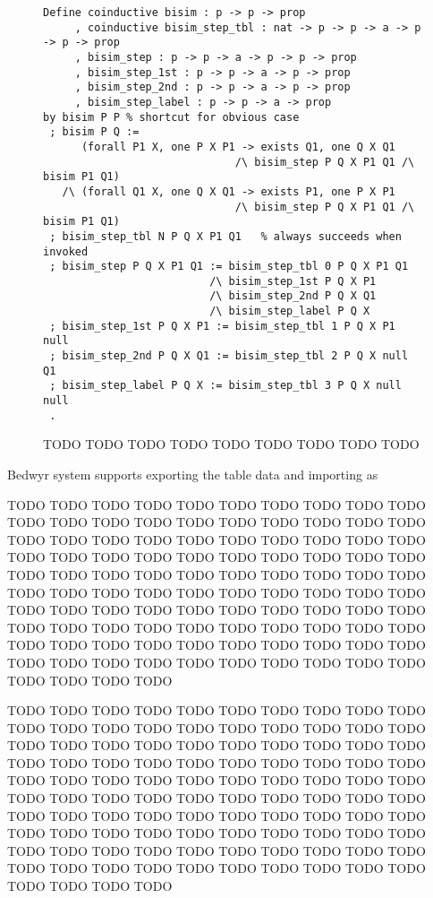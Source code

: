 \documentclass{llncs}
\begin{document}
\begin{figure}
\begin{verbatim}
Define coinductive bisim : p -> p -> prop
     , coinductive bisim_step_tbl : nat -> p -> p -> a -> p -> p -> prop
     , bisim_step : p -> p -> a -> p -> p -> prop
     , bisim_step_1st : p -> p -> a -> p -> prop
     , bisim_step_2nd : p -> p -> a -> p -> prop
     , bisim_step_label : p -> p -> a -> prop
by bisim P P % shortcut for obvious case
 ; bisim P Q :=
      (forall P1 X, one P X P1 -> exists Q1, one Q X Q1
                              /\ bisim_step P Q X P1 Q1 /\ bisim P1 Q1)
   /\ (forall Q1 X, one Q X Q1 -> exists P1, one P X P1
                              /\ bisim_step P Q X P1 Q1 /\ bisim P1 Q1)
 ; bisim_step_tbl N P Q X P1 Q1   % always succeeds when invoked
 ; bisim_step P Q X P1 Q1 := bisim_step_tbl 0 P Q X P1 Q1
                          /\ bisim_step_1st P Q X P1
                          /\ bisim_step_2nd P Q X Q1
                          /\ bisim_step_label P Q X
 ; bisim_step_1st P Q X P1 := bisim_step_tbl 1 P Q X P1 null
 ; bisim_step_2nd P Q X Q1 := bisim_step_tbl 2 P Q X null Q1
 ; bisim_step_label P Q X := bisim_step_tbl 3 P Q X null null
 .
\end{verbatim}
\vspace*{-3ex}
\caption{TODO TODO TODO TODO TODO TODO TODO TODO TODO}
\label{fig:ccsbisim}
\end{figure}

Bedwyr system supports exporting the table data and importing as

TODO TODO TODO TODO TODO TODO TODO TODO TODO TODO TODO TODO TODO
TODO TODO TODO TODO TODO TODO TODO TODO TODO TODO TODO TODO TODO
TODO TODO TODO TODO TODO TODO TODO TODO TODO TODO TODO TODO TODO
TODO TODO TODO TODO TODO TODO TODO TODO TODO TODO TODO TODO TODO
TODO TODO TODO TODO TODO TODO TODO TODO TODO TODO TODO TODO TODO
TODO TODO TODO TODO TODO TODO TODO TODO TODO TODO TODO TODO TODO
TODO TODO TODO TODO TODO TODO TODO TODO TODO TODO TODO TODO TODO
TODO TODO TODO TODO TODO TODO TODO TODO TODO TODO TODO TODO TODO

TODO TODO TODO TODO TODO TODO TODO TODO TODO TODO TODO TODO TODO
TODO TODO TODO TODO TODO TODO TODO TODO TODO TODO TODO TODO TODO
TODO TODO TODO TODO TODO TODO TODO TODO TODO TODO TODO TODO TODO
TODO TODO TODO TODO TODO TODO TODO TODO TODO TODO TODO TODO TODO
TODO TODO TODO TODO TODO TODO TODO TODO TODO TODO TODO TODO TODO
TODO TODO TODO TODO TODO TODO TODO TODO TODO TODO TODO TODO TODO
TODO TODO TODO TODO TODO TODO TODO TODO TODO TODO TODO TODO TODO
TODO TODO TODO TODO TODO TODO TODO TODO TODO TODO TODO TODO TODO
\end{document}
